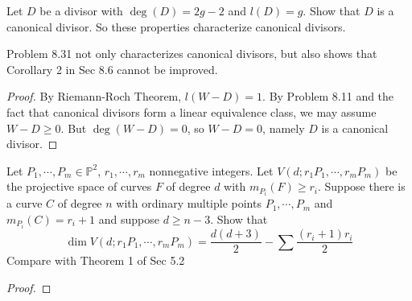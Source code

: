 \documentclass{solution}
\begin{document}
\begin{problem}{8.31}
    Let $D$ be a divisor with $\deg(D) = 2g - 2$ and $l(D) = g$. Show that $D$ is a canonical divisor. So these properties characterize canonical divisors.
\end{problem}

Problem 8.31 not only characterizes canonical divisors, but also shows that Corollary 2 in Sec 8.6 cannot be improved.

\begin{proof}
    By Riemann-Roch Theorem, $l(W - D) = 1$. By Problem 8.11 and the fact that canonical divisors form a linear equivalence class, we may assume $W - D \ge 0$. But $\deg(W - D) = 0$, so $W - D = 0$, namely $D$ is a canonical divisor.
\end{proof}

\begin{problem}{8.32}
    Let $P_1, \cdots, P_m \in \mathbb{P}^2$, $r_1, \cdots, r_m$ nonnegative integers. Let $V(d; r_1 P_1, \cdots, r_mP_m)$ be the projective space of curves $F$ of degree $d$ with $m_{P_i}(F) \ge r_i$. Suppose there is a curve $C$ of degree $n$ with ordinary multiple points $P_1, \cdots, P_m$ and $m_{P_i}(C) = r_i + 1$ and suppose $d \ge n - 3$. Show that
    $$\dim V(d; r_1 P_1, \cdots, r_mP_m) = \frac{d(d + 3)}{2} - \sum \frac{(r_i + 1)r_i}{2}$$
    Compare with Theorem 1 of Sec 5.2
\end{problem}

\begin{proof}
    \TODO
\end{proof}
\end{document}
